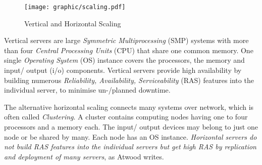 \begin{figure}[ht]
    \begin{center}
        \texttt{[image: graphic/scaling.pdf]}
        \caption{Vertical and Horizontal Scaling}
        \label{scaling_figure}
    \end{center}
\end{figure}

Vertical servers are large \emph{Symmetric Multiprocessing} (SMP) systems with
more than four \emph{Central Processing Units} (CPU) that share one common memory.
One single \emph{Operating System} (OS) instance covers the processors, the memory
and input/ output (i/o) components. Vertical servers provide high availability by
building numerous \emph{Reliability, Availability, Serviceability} (RAS) features
into the individual server, to minimise un-/planned downtime.

The alternative horizontal scaling connects many systems over network, which is
often called \emph{Clustering}. A cluster contains computing nodes having one to
four processors and a memory each. The input/ output devices may belong to just
one node or be shared by many. Each node has an OS instance. \textit{Horizontal
servers do not build RAS features into the individual servers but get high RAS
by replication and deployment of many servers}, as Atwood \cite{atwood} writes.

